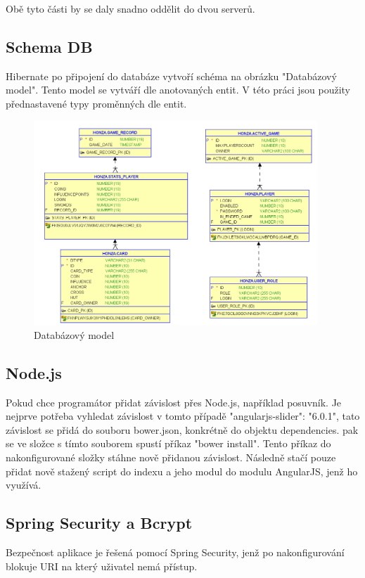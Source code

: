 \documentclass[czech,master,public,dept460,male,cpdeclaration,twoside]{diploma}
\begin{document}
Obě tyto části by se daly snadno oddělit do dvou serverů.

\subsection{Schema DB}
Hibernate po připojení do databáze vytvoří schéma na obrázku "Databázový model". Tento model se vytváří dle anotovaných entit. V této práci jsou použity přednastavené typy proměnných dle entit.
\\
\begin{figure}[H]
\centering\includegraphics[width=0.95\textwidth]{Figures/DBmodel.png}\caption{Databázový model}
\end{figure}

\subsection{Node.js}
Pokud chce programátor přidat závislost přes Node.js, například posuvník. Je nejprve potřeba vyhledat závislost v tomto případě "angularjs-slider": "6.0.1", tato závislost se přidá do souboru bower.json, konkrétně do objektu dependencies. pak se ve složce s tímto souborem spustí příkaz "bower install". Tento příkaz do nakonfigurované složky stáhne nově přidanou závislost. Následně stačí pouze přidat nově stažený script do indexu a jeho modul do modulu AngularJS, jenž ho využívá. 

\subsection{Spring Security a Bcrypt}
Bezpečnost aplikace je řešená pomocí Spring Security, jenž po nakonfigurování blokuje URI na který uživatel nemá přístup.
\end{document}
